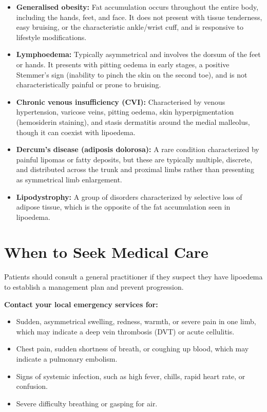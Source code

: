 \begin{itemize}
    \item \textbf{Generalised obesity:} Fat accumulation occurs throughout the entire body, including the hands, feet, and face. It does not present with tissue tenderness, easy bruising, or the characteristic ankle/wrist cuff, and is responsive to lifestyle modifications.
    \item \textbf{Lymphoedema:} Typically asymmetrical and involves the dorsum of the feet or hands. It presents with pitting oedema in early stages, a positive Stemmer's sign (inability to pinch the skin on the second toe), and is not characteristically painful or prone to bruising.
    \item \textbf{Chronic venous insufficiency (CVI):} Characterised by venous hypertension, varicose veins, pitting oedema, skin hyperpigmentation (hemosiderin staining), and stasis dermatitis around the medial malleolus, though it can coexist with lipoedema.
    \item \textbf{Dercum's disease (adiposis dolorosa):} A rare condition characterized by painful lipomas or fatty deposits, but these are typically multiple, discrete, and distributed across the trunk and proximal limbs rather than presenting as symmetrical limb enlargement.
    \item \textbf{Lipodystrophy:} A group of disorders characterized by selective loss of adipose tissue, which is the opposite of the fat accumulation seen in lipoedema.
\end{itemize}

\section*{When to Seek Medical Care}
Patients should consult a general practitioner if they suspect they have lipoedema to establish a management plan and prevent progression.

\textbf{Contact your local emergency services for:}
\begin{itemize}
    \item Sudden, asymmetrical swelling, redness, warmth, or severe pain in one limb, which may indicate a deep vein thrombosis (DVT) or acute cellulitis.
    \item Chest pain, sudden shortness of breath, or coughing up blood, which may indicate a pulmonary embolism.
    \item Signs of systemic infection, such as high fever, chills, rapid heart rate, or confusion.
    \item Severe difficulty breathing or gasping for air.
\end{itemize}

